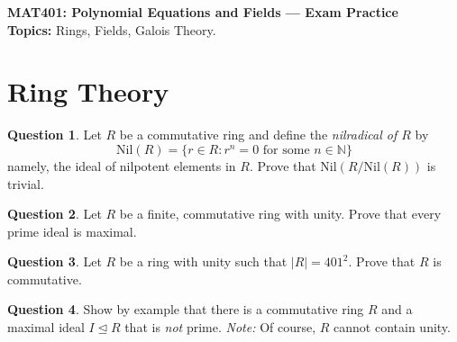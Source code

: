\documentclass[11pt]{article}
\def\mbb{\mathbb}
\def\R{\mbb{R}}
\def\N{\mbb{N}}
\theoremstyle{pink}
\theoremstyle{boxedsolution}
\theoremstyle{definition}
\newtheorem{question}{Question}
\theoremstyle{claim}
\begin{document}
\thispagestyle{empty}

\begin{framed}
    \begin{center}
        \large\textbf{MAT401: Polynomial Equations and Fields --- Exam Practice} \vspace{3mm}\\
        \textbf{Topics:} Rings, Fields, Galois Theory.
    \end{center}
\end{framed}

\section*{Ring Theory}

\begin{question}
    Let $R$ be a commutative ring and define the \textit{nilradical of $R$} by 
    \[
    \mathrm{Nil}(R) = \{r \in R: r^n = 0 \text{ for some } n \in \N\}
    \]
    namely, the ideal of nilpotent elements in $R$. Prove that $\mathrm{Nil}(R/\mathrm{Nil}(R))$ is trivial.
\end{question}

\begin{question}
    Let $R$ be a finite, commutative ring with unity. Prove that every prime ideal is maximal.
\end{question}

\begin{question}
    Let $R$ be a ring with unity such that  $|R| = 401^2$. Prove that $R$ is commutative.
\end{question}

\begin{question}
    Show by example that there is a commutative ring $R$ and a maximal ideal $I \trianglelefteq R$ that is \textit{not} prime. \textit{Note:} Of course, $R$ cannot contain unity.
\end{question}


\end{document}
